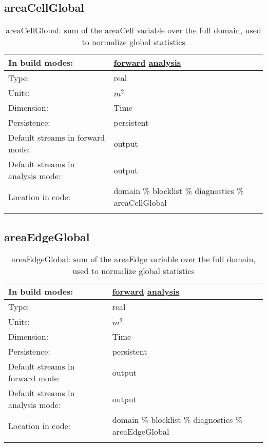 \subsection[areaCellGlobal]{areaCellGlobal}
\label{subsec:var_sec_diagnostics_areaCellGlobal}
\begin{center}
\begin{longtable}{| p{2.0in} | p{4.0in} |}
        \hline 
        In build modes: & \hyperref[subsec:forward_var_tab_diagnostics]{forward} \hyperref[subsec:analysis_var_tab_diagnostics]{analysis} \\
        \hline 
        Type: & real \\
        \hline 
        Units: & $m^2$ \\
        \hline 
        Dimension: & Time \\
        \hline 
        Persistence: & persistent \\
        \hline 
		 Default streams in forward mode: &  output \\
        \hline 
		 Default streams in analysis mode: &  output \\
        \hline 
		 Location in code: & domain \% blocklist \% diagnostics \% areaCellGlobal \\
		 \hline 
    \caption{areaCellGlobal: sum of the areaCell variable over the full domain, used to normalize global statistics}
\end{longtable}
\end{center}
\subsection[areaEdgeGlobal]{areaEdgeGlobal}
\label{subsec:var_sec_diagnostics_areaEdgeGlobal}
\begin{center}
\begin{longtable}{| p{2.0in} | p{4.0in} |}
        \hline 
        In build modes: & \hyperref[subsec:forward_var_tab_diagnostics]{forward} \hyperref[subsec:analysis_var_tab_diagnostics]{analysis} \\
        \hline 
        Type: & real \\
        \hline 
        Units: & $m^2$ \\
        \hline 
        Dimension: & Time \\
        \hline 
        Persistence: & persistent \\
        \hline 
		 Default streams in forward mode: &  output \\
        \hline 
		 Default streams in analysis mode: &  output \\
        \hline 
		 Location in code: & domain \% blocklist \% diagnostics \% areaEdgeGlobal \\
		 \hline 
    \caption{areaEdgeGlobal: sum of the areaEdge variable over the full domain, used to normalize global statistics}
\end{longtable}
\end{center}
